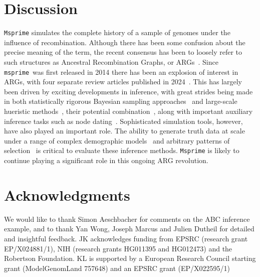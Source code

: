 \documentclass[graybox]{svmult}
\newcommand{\msprime}[0]{\texttt{msprime}}
\begin{document}
\section{Discussion}
\label{sec:discussion}
\texttt{Msprime} simulates the complete history of a sample of genomes under
the influence of recombination. Although there has been some confusion about
the precise meaning of the term, the recent consensus has been to loosely
refer to such structures as Ancestral Recombination Graphs, or
ARGs~\citep{wong2024general}. Since \msprime\ was first released in 2014
there has been an explosion of interest in ARGs, with four separate
review articles published in 2024~\citep{brandt2024promise,
lewanski2024era,nielsen2024inference,wong2024general}.
This has largely been
driven by exciting developments in inference, with great strides being
made in both statistically rigorous Bayesian sampling
approaches~\citep{rasmussen2014genome,mahmoudi2022bayesian,deng2024robust}
and large-scale hueristic
methods~\cite{speidel2019method,kelleher2019inferring,
zhang2023biobank,gunnarsson2024scalable},
their potential combination~\citep{bisschop2025likelihoods},
along with important auxiliary inference tasks such as node
dating~\cite{wohns2022unified,deng2025general}.
Sophisticated simulation tools, however, have also played an important
role. The ability to generate truth data at scale
under a range of complex demographic
models~\citep{adrion2020stdpopsim,gower2022demes,lauterbur2023expanding}
and arbitrary patterns of
selection~\citep{kelleher2018efficient,haller2018tree,gower2025accessible}
is critical to evaluate these inference methods.
\texttt{Msprime} is likely to continue playing a significant role
in this ongoing ARG revolution.

\section*{Acknowledgments}

We would like to thank Simon Aeschbacher for comments on the ABC inference example,
and to thank Yan Wong, Joseph Marcus and Julien Dutheil for
detailed and insightful feedback.
JK acknowledges funding from EPSRC (research grant EP/X024881/1),
NIH (research grants HG011395 and HG012473)
and the Robertson Foundation.
KL is supported by a European Research Council starting grant (ModelGenomLand 757648) and an EPSRC grant (EP/X022595/1)
\end{document}
